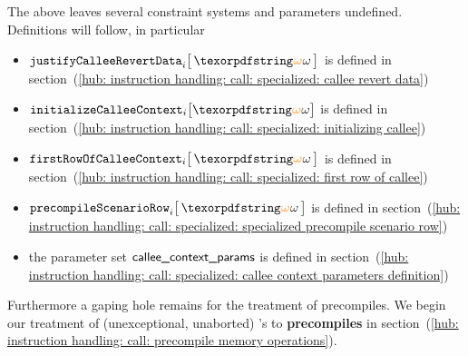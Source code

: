 The above leaves several constraint systems and parameters undefined. Definitions will follow, in particular
\begin{itemize}
	\item $\justifyCalleeRevertData       {i}{\relof}$               is defined in section~(\ref{hub: instruction handling: call: specialized: callee revert data})
	\item $\initializeCalleeContextName  _{i} \big[ \relof \big]$    is defined in section~(\ref{hub: instruction handling: call: specialized: initializing callee})
	\item $\firstRowOfCallee              {i}{\relof}$               is defined in section~(\ref{hub: instruction handling: call: specialized: first row of callee})
	\item $\precompileScenarioRow         {i}{\relof}$               is defined in section~(\ref{hub: instruction handling: call: specialized: specialized precompile scenario row})
	\item the parameter set $\textsf{callee\_context\_params}$ is defined in section~(\ref{hub: instruction handling: call: specialized: callee context parameters definition})
\end{itemize}
Furthermore a gaping hole remains for the treatment of precompiles.
We begin our treatment of (unexceptional, unaborted) 's to \textbf{precompiles} in section~(\ref{hub: instruction handling: call: precompile memory operations}).
